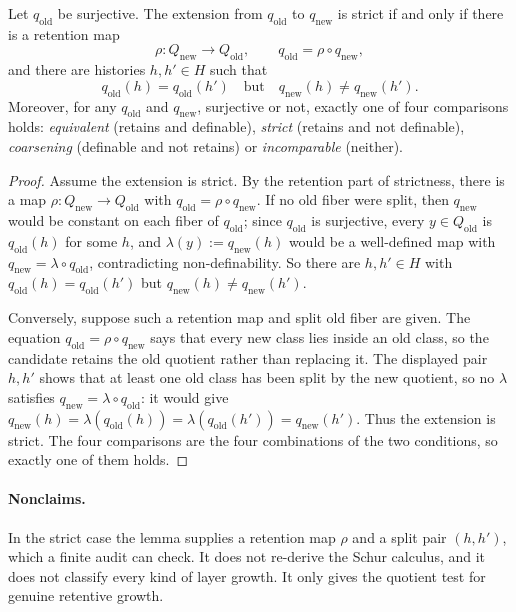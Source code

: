 \begin{lemma}\label{lem:F8}
Let \(q_{\mathrm{old}}\) be surjective. The extension from \(q_{\mathrm{old}}\) to \(q_{\mathrm{new}}\) is
strict if and only if there is a retention map
\[
  \rho:Q_{\mathrm{new}}\to Q_{\mathrm{old}},
  \qquad
  q_{\mathrm{old}}=\rho\circ q_{\mathrm{new}},
\]
and there are histories \(h,h'\in H\) such that
\[
  q_{\mathrm{old}}(h)=q_{\mathrm{old}}(h')
  \quad\text{but}\quad
  q_{\mathrm{new}}(h)\ne q_{\mathrm{new}}(h').
\]
Moreover, for any \(q_{\mathrm{old}}\) and \(q_{\mathrm{new}}\), surjective or not, exactly one of
four comparisons holds: \emph{equivalent} (retains and definable),
\emph{strict} (retains and not definable), \emph{coarsening} (definable and
not retains) or \emph{incomparable} (neither).
\end{lemma}
\begin{proof}
Assume the extension is strict.  By the retention part of strictness,
there is a map \(\rho:Q_{\mathrm{new}}\to Q_{\mathrm{old}}\) with
\(q_{\mathrm{old}}=\rho\circ q_{\mathrm{new}}\).  If no old fiber were
split, then \(q_{\mathrm{new}}\) would be constant on each fiber of
\(q_{\mathrm{old}}\); since \(q_{\mathrm{old}}\) is surjective, every
\(y\in Q_{\mathrm{old}}\) is \(q_{\mathrm{old}}(h)\) for some \(h\), and
\(\lambda(y):=q_{\mathrm{new}}(h)\) would be a well-defined map with
\(q_{\mathrm{new}}=\lambda\circ q_{\mathrm{old}}\), contradicting
non-definability.  So there are \(h,h'\in H\) with
\(q_{\mathrm{old}}(h)=q_{\mathrm{old}}(h')\) but
\(q_{\mathrm{new}}(h)\ne q_{\mathrm{new}}(h')\).

Conversely, suppose such a retention map and split old fiber are
given.  The equation \(q_{\mathrm{old}}=\rho\circ q_{\mathrm{new}}\)
says that every new class lies inside an old class, so the candidate
retains the old quotient rather than replacing it.  The displayed
pair \(h,h'\) shows that at least one old class has been split by
the new quotient, so no \(\lambda\) satisfies
\(q_{\mathrm{new}}=\lambda\circ q_{\mathrm{old}}\): it would give
\(q_{\mathrm{new}}(h)=\lambda(q_{\mathrm{old}}(h))=\lambda(q_{\mathrm{old}}(h'))=q_{\mathrm{new}}(h')\).
Thus the extension is strict.  The four comparisons are the four
combinations of the two conditions, so exactly one of them holds.
\end{proof}

\paragraph{Nonclaims.} In the strict case the lemma supplies a
retention map \(\rho\) and a split pair \((h,h')\), which a finite audit
can check.  It does not re-derive the Schur calculus,
and it does not classify every kind of layer growth.  It only gives
the quotient test for genuine retentive growth.


